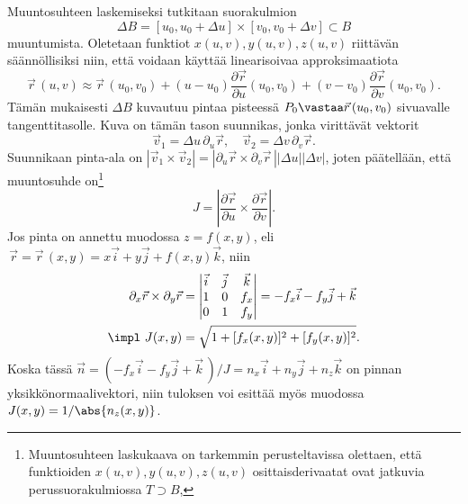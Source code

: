 Muuntosuhteen laskemiseksi tutkitaan suorakulmion 
\[
\Delta B=[u_0,u_0+\Delta u]\times [v_0,v_0+\Delta v] \subset B
\]
muuntumista. Oletetaan funktiot $x(u,v), y(u,v), z(u,v)$ riittävän säännöllisiksi niin, että 
voidaan käyttää linearisoivaa approksimaatiota
\[
\vec r\,(u,v) \approx \vec r\,(u_0,v_0)+(u-u_0)\frac{\partial\vec r}{\partial u}(u_0,v_0)
                                       +(v-v_0)\frac{\partial\vec r}{\partial v}(u_0,v_0).
\]
Tämän mukaisesti $\Delta B$ kuvautuu pintaa pisteessä $P_0\vastaa\vec r\,(u_0,v_0)$ sivuavalle
tangenttitasolle. Kuva on tämän tason suunnikas, jonka virittävät vektorit
\[
\vec v_1=\Delta u\,\partial_u\vec r,\quad \vec v_2=\Delta v\,\partial_v\vec r.
\]
Suunnikaan pinta-ala on 
$|\vec v_1\times\vec v_2|=|\partial_u\vec r\times\partial_v\vec r\,||\Delta u||\Delta v|$,
joten päätellään, että muuntosuhde on\footnote[2]{Muuntosuhteen laskukaava on tarkemmin
perusteltavissa olettaen, että funktioiden $x(u,v), y(u,v), z(u,v)$ osittaisderivaatat ovat
jatkuvia perussuorakulmiossa $T \supset B$,}
\[
J=\left|\frac{\partial\vec r}{\partial u}\times\frac{\partial\vec r}{\partial v}\right|.
\]
Jos pinta on annettu muodossa $z=f(x,y)$, eli
$\,\vec r=\vec r\,(x,y)=x\vec i+y\vec j+f(x,y)\vec k$, niin
\begin{align*}
\partial_x\vec r\times\partial_y\vec r 
               &= \begin{vmatrix} 
                  \vec i & \vec j & \vec k \\ 1 & 0 & f_x \\ 0 & 1 & f_y 
                  \end{vmatrix} 
                = -f_x\vec i-f_y\vec j+\vec k \\
\impl \ J(x,y) &= \sqrt{1+[f_x(x,y)]^2+[f_y(x,y)]^2}.
\end{align*}
Koska tässä $\vec n=(-f_x\vec i-f_y\vec j+\vec k\,)/J=n_x\vec i+n_y\vec j+n_z\vec k$ on pinnan
yksikkönormaalivektori, niin tuloksen voi esittää myös muodossa $J(x,y)=1/\abs{n_z(x,y)}$.

